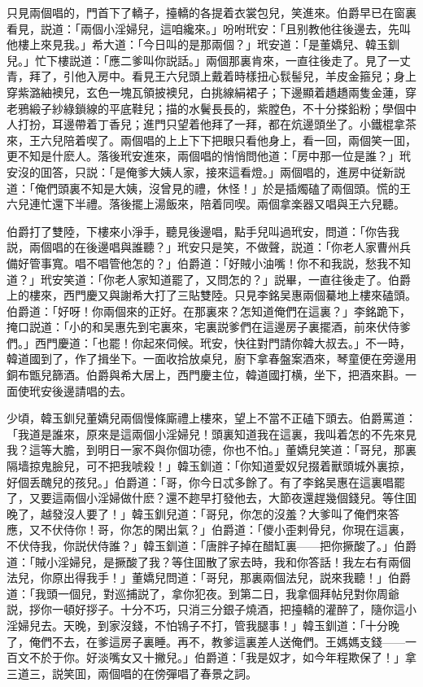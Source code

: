 只見兩個唱的，門首下了轎子，擡轎的各提着衣裳包兒，笑進來。伯爵早已在窗裏看見，説道：「兩個小淫婦兒，這咱纔來。」吩咐玳安：「且别教他往後邊去，先叫他樓上來見我。」希大道：「今日叫的是那兩個？」玳安道：「是董嬌兒、韓玉釧兒。」忙下樓説道：「應二爹叫你説話。」兩個那裏肯來，一直往後走了。見了一丈青，拜了，引他入房中。看見王六兒頭上戴着時樣扭心䯼髻兒，羊皮金箍兒；身上穿紫潞紬襖兒，玄色一塊瓦領披襖兒，白挑線絹裙子；下邊顯着趫趫兩隻金蓮，穿老鴉緞子紗綠鎖線的平底鞋兒；描的水鬢長長的，紫膛色，不十分搽鉛粉；學個中人打扮，耳邊帶着丁香兒；進門只望着他拜了一拜，都在炕邊頭坐了。小鐵棍拿茶來，王六兒陪着喫了。兩個唱的上上下下把眼只看他身上，看一回，兩個笑一囬，更不知是什麽人。落後玳安進來，兩個唱的悄悄問他道：「房中那一位是誰？」玳安沒的囬答，只説：「是俺爹大姨人家，接來這看燈。」兩個唱的，進房中従新説道：「俺們頭裏不知是大姨，沒曾見的禮，休怪！」於是插燭磕了兩個頭。慌的王六兒連忙還下半禮。落後擺上湯飯來，陪着同喫。兩個拿楽器又唱與王六兒聽。

伯爵打了雙陸，下樓來小淨手，聽見後邊唱，點手兒叫過玳安，問道：「你告我説，兩個唱的在後邊唱與誰聽？」玳安只是笑，不做聲，説道：「你老人家曹州兵備好管事寬。唱不唱管他怎的？」伯爵道：「好賊小油嘴！你不和我説，愁我不知道？」玳安笑道：「你老人家知道罷了，又問怎的？」説畢，一直往後走了。伯爵上的樓來，西門慶又與謝希大打了三貼雙陸。只見李銘吴惠兩個驀地上樓來磕頭。伯爵道：「好呀！你兩個來的正好。在那裏來？怎知道俺們在這裏？」李銘跪下，掩口説道：「小的和吴惠先到宅裏來，宅裏説爹們在這邊房子裏擺酒，前來伏侍爹們。」西門慶道：「也罷！你起來伺候。玳安，快往對門請你韓大叔去。」不一時，韓道國到了，作了揖坐下。一面收拾放桌兒，廚下拿春盤案酒來，琴童便在旁邊用銅布甑兒篩酒。伯爵與希大居上，西門慶主位，韓道國打横，坐下，把酒來斟。一面使玳安後邊請唱的去。

少頃，韓玉釧兒董嬌兒兩個慢條廝禮上樓來，望上不當不正磕下頭去。伯爵罵道：「我道是誰來，原來是這兩個小淫婦兒！頭裏知道我在這裏，我叫着怎的不先來見我？這等大膽，到明日一家不與你個功德，你也不怕。」董嬌兒笑道：「哥兒，那裏隔墙掠鬼臉兒，可不把我唬殺！」韓玉釧道：「你知道愛奴兒掇着獸頭城外裏掠，好個丢醜兒的孩兒。」伯爵道：「哥，你今日忒多餘了。有了李銘吴惠在這裏唱罷了，又要這兩個小淫婦做什麽？還不趂早打發他去，大節夜還趕幾個錢兒。等住囬晚了，越發沒人要了！」韓玉釧兒道：「哥兒，你怎的沒羞？大爹叫了俺們來答應，又不伏侍你！哥，你怎的閑出氣？」伯爵道：「儍小歪剌骨兒，你現在這裏，不伏侍我，你説伏侍誰？」韓玉釧道：「唐胖子掉在醋缸裏——把你撅酸了。」伯爵道：「賊小淫婦兒，是撅酸了我？等住囬散了家去時，我和你答話！我左右有兩個法兒，你原出得我手！」董嬌兒問道：「哥兒，那裏兩個法兒，説來我聽！」伯爵道：「我頭一個兒，對巡捕説了，拿你犯夜。到第二日，我拿個拜帖兒對你周爺説，拶你一頓好拶子。十分不巧，只消三分銀子燒酒，把擡轎的灌醉了，隨你這小淫婦兒去。天晚，到家沒錢，不怕鴇子不打，管我腿事！」韓玉釧道：「十分晚了，俺們不去，在爹這房子裏睡。再不，教爹這裏差人送俺們。王媽媽支錢——一百文不於于你。好淡嘴女又十撇兒。」伯爵道：「我是奴才，如今年程欺保了！」拿三道三，説笑囬，兩個唱的在傍彈唱了春景之詞。

